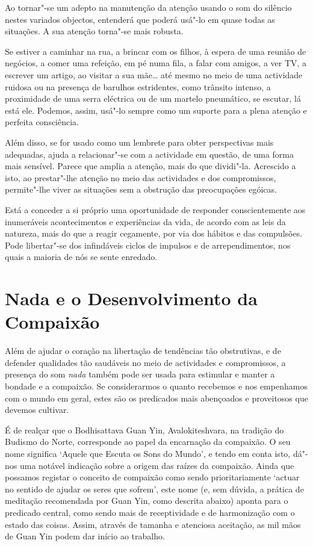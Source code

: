Ao tornar"-se um adepto na manutenção da atenção usando o som do silêncio
nestes variados objectos, entenderá que poderá usá"-lo em quase todas as
situações. A sua atenção torna"-se mais robusta.

Se estiver a caminhar na rua, a brincar com os filhos, à espera de uma
reunião de negócios, a comer uma refeição, em pé numa fila, a falar com
amigos, a ver TV, a escrever um artigo, ao visitar a sua mãe\ldots{} até
mesmo no meio de uma actividade ruidosa ou na presença de barulhos
estridentes, como trânsito intenso, a proximidade de uma serra eléctrica
ou de um martelo pneumático, se escutar, lá está ele. Podemos, assim,
usá"-lo sempre como um suporte para a plena atenção e perfeita
consciência.

Além disso, se for usado como um lembrete para obter perspectivas mais
adequadas, ajuda a relacionar"-se com a actividade em questão, de uma
forma mais sensível. Parece que amplia a atenção, mais do que dividi"-la.
Acrescido a isto, ao prestar"-lhe atenção no meio das actividades e dos
compromissos, permite"-lhe viver as situações sem a obstrução das
preocupações egóicas.

Está a conceder a si próprio uma oportunidade de responder
conscientemente aos inumeráveis acontecimentos e experiências da vida,
de acordo com as leis da natureza, mais do que a reagir cegamente, por
via dos hábitos e das compulsões. Pode libertar"-se dos infindáveis
ciclos de impulsos e de arrependimentos, nos quais a maioria de nós se
sente enredado.

\section{Nada e o Desenvolvimento da Compaixão}

Além de ajudar o coração na libertação de tendências tão obstrutivas, e
de defender qualidades tão saudáveis no meio de actividades e
compromissos, a presença do som \emph{nada} também pode ser usada para
estimular e manter a bondade e a compaixão. Se considerarmos o quanto
recebemos e nos empenhamos com o mundo em geral, estes são os predicados
mais abençoados e proveitosos que devemos cultivar.

É de realçar que o Bodhisattava Guan Yin, Avalokiteshvara, na tradição
do Budismo do Norte, corresponde ao papel da encarnação da compaixão. O
seu nome significa `Aquele que Escuta os Sons do Mundo', e tendo em
conta isto, dá"-nos uma notável indicação sobre a origem das raízes da
compaixão. Ainda que possamos registar o conceito de compaixão como
sendo prioritariamente `actuar no sentido de ajudar os seres que
sofrem', este nome (e, sem dúvida, a prática de meditação recomendada
por Guan Yin, como descrita abaixo) aponta para o predicado central,
como sendo mais de receptividade e de harmonização com o estado das
coisas. Assim, através de tamanha e atenciosa aceitação, as mil mãos de
Guan Yin podem dar início ao trabalho.

